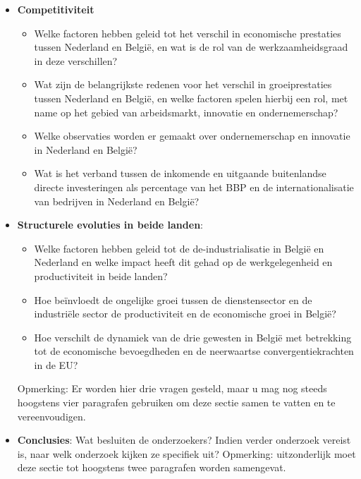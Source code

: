 \documentclass{report}
\begin{document}
\begin{itemize}
		\item \textbf{Competitiviteit}
		\begin{itemize}
			\item Welke factoren hebben geleid tot het verschil in economische prestaties tussen Nederland en België, en wat is de rol van de werkzaamheidsgraad in deze verschillen?
			\item Wat zijn de belangrijkste redenen voor het verschil in groeiprestaties tussen Nederland en België, en welke factoren spelen hierbij een rol, met name op het gebied van arbeidsmarkt, innovatie en ondernemerschap?
			\item Welke observaties worden er gemaakt over ondernemerschap en innovatie in Nederland en België?
			\item Wat is het verband tussen de inkomende en uitgaande buitenlandse directe investeringen als percentage van het BBP en de internationalisatie van bedrijven in Nederland en België?
		\end{itemize}
		\item \textbf{Structurele evoluties in beide landen}:
		\begin{itemize}
			\item Welke factoren hebben geleid tot de de-industrialisatie in België en Nederland en welke impact heeft dit gehad op de werkgelegenheid en productiviteit in beide landen?
			\item Hoe beïnvloedt de ongelijke groei tussen de dienstensector en de industriële sector de productiviteit en de economische groei in België?
			\item Hoe verschilt de dynamiek van de drie gewesten in België met betrekking tot de economische bevoegdheden en de neerwaartse convergentiekrachten in de EU?
		\end{itemize}
	Opmerking: Er worden hier drie vragen gesteld, maar u mag nog steeds hoogstens vier paragrafen gebruiken om deze sectie samen te vatten en te vereenvoudigen.
		\item \textbf{Conclusies}: Wat besluiten de onderzoekers?  Indien verder onderzoek vereist is, naar welk onderzoek kijken ze specifiek uit? Opmerking: uitzonderlijk moet deze sectie tot hoogstens twee paragrafen worden samengevat.
	\end{itemize} 
\end{document}
